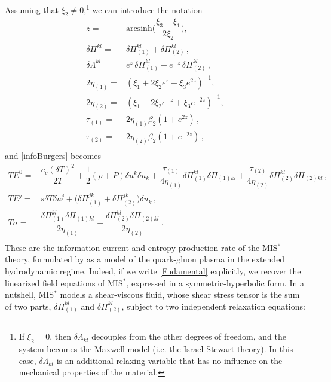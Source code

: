 \documentclass[a4paper, amsfonts, amssymb, amsmath, reprint, showkeys, nofootinbib, twoside, onecolumn,notitlepage]{revtex4-1}
\begin{document}
Assuming that $\xi_2 \neq 0$,\footnote{If $\xi_2=0$, then $\delta \Lambda_{kl}$ decouples from the other degrees of freedom, and the system becomes the Maxwell model (i.e. the Israel-Stewart theory). In this case, $\delta \Lambda_{kl}$ is an additional relaxing variable that has no influence on the mechanical properties of the material.} we can introduce the notation
\begin{equation}
\begin{split}
 z={}& \text{arcsinh}\bigg( \dfrac{\xi_3-\xi_1}{2\xi_2} \bigg),\\
\delta \Pi^{kl} ={}& \delta \Pi^{kl}_{(1)} + \delta \Pi^{kl}_{(2)} \, , \\
\delta \Lambda^{kl} ={}& e^z \, \delta \Pi^{kl}_{(1)} - e^{-z} \, \delta \Pi^{kl}_{(2)} \, , \\
2\eta_{(1)} ={}& (\xi_1+2\xi_2 e^z + \xi_3 e^{2z})^{-1}, \\
2\eta_{(2)} ={}& (\xi_1-2\xi_2 e^{-z} + \xi_3 e^{-2z})^{-1}, \\
\tau_{(1)}={}& 2\eta_{(1)}\beta_2 (1+e^{2z}) \, , \\
\tau_{(2)} ={}& 2\eta_{(2)}\beta_2 (1+e^{-2z})\, , \\
\end{split}
\end{equation} 
and \eqref{infoBurgers} becomes
\begin{equation}\label{infoKe}
\begin{split}
TE^0 ={}& \dfrac{c_v (\delta T)^2}{2T} + \dfrac{1}{2}(\rho{+}P)\delta u^k \delta u_k +\dfrac{\tau_{(1)}}{4 \eta_{(1)}} \delta \Pi^{kl}_{(1)}\delta \Pi_{(1)kl}+\dfrac{\tau_{(2)}}{4 \eta_{(2)}} \delta \Pi^{kl}_{(2)}\delta \Pi_{(2)kl}\, , \\
TE^j ={}& s  \delta T \delta u^j + \big(\delta \Pi^{jk}_{(1)}+\delta \Pi^{jk}_{(2)} \big)\delta u_k \, , \\
T\sigma ={}&   \dfrac{\delta\Pi^{kl}_{(1)}\delta \Pi_{(1)kl}}{2\eta_{(1)}}+\dfrac{\delta \Pi^{kl}_{(2)}\delta \Pi_{(2)kl}}{2\eta_{(2)}} \, . \\
\end{split}
\end{equation}
These are the information current and entropy production rate of the MIS$^*$ theory, formulated by \cite{KeYin2022} as a model of the quark-gluon plasma in the extended hydrodynamic regime. Indeed, if we write \eqref{Fudamental} explicitly, we recover the linearized field equations of MIS$^*$, expressed in a symmetric-hyperbolic form. In a nutshell, MIS$^*$ models a shear-viscous fluid, whose shear stress tensor is the sum of two parts, $\delta \Pi_{(1)}^{kl}$ and $\delta \Pi^{kl}_{(2)}$, subject to two independent relaxation equations:
\end{document}
